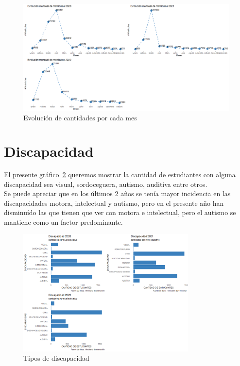 \begin{figure}[h]
\centering
\includegraphics[width=1.2\textwidth]{Figures/evolucionMatriculas}
\decoRule
\caption[Matrículas]{Evolución de cantidades por cada mes}
\label{fig:matriculas}
\end{figure}

\section{Discapacidad}

El presente gráfico~\ref{fig:discapacidad} queremos mostrar la cantidad de estudiantes con alguna discapacidad sea visual, sordoceguera, autismo, auditiva entre otros.\\
Se puede apreciar que en los últimos 2 años se tenía mayor incidencia en las discapacidades motora, intelectual y autismo, pero en el presente año han disminuído las que tienen que ver con motora e intelectual, pero el autismo se mantiene como un factor predominante.

\begin{figure}[th]
\centering
\includegraphics[width=0.8\textwidth]{Figures/discapacidad}
\decoRule
\caption[Discapacidad]{Tipos de discapacidad}
\label{fig:discapacidad}
\end{figure}


